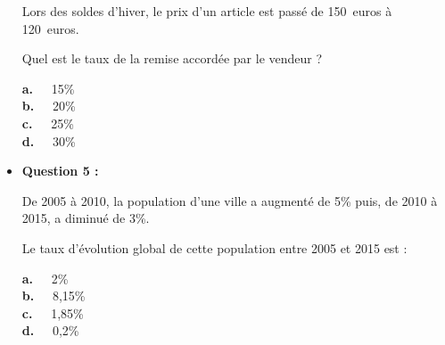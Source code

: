 \begin{itemize}
     \par
     Lors des soldes d'hiver, le prix d'un article est passé de 150~euros à 120~euros.
     \par
     Quel est le taux de la remise accordée par le vendeur ?
     \par
     \textbf{a.~~} 15\% \\
     \textbf{b.~~} 20\%  \\
     \textbf{c.~~} 25\% \\
     \textbf{d.~~} 30\% \\
     \par
     \item \textbf{Question 5 :}
     \par
     De 2005 à 2010, la population d'une ville a augmenté de 5\% puis, de 2010 à 2015, a diminué de 3\%.
     \par
     Le taux d'évolution global de cette population entre 2005 et 2015 est :
     \par
     \textbf{a.~~} 2\% \\
     \textbf{b.~~} 8,15\%  \\
     \textbf{c.~~} 1,85\% \\
     \textbf{d.~~} 0,2\% \\
     \par
\end{itemize}
